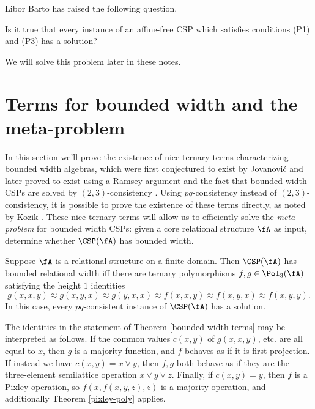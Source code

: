 Libor Barto has raised the following question.

\begin{prob}\label{prob-p1-p3} Is it true that every instance of an affine-free CSP which satisfies conditions (P1) and (P3) has a solution?
\end{prob}

We will solve this problem later in these notes.


\section{Terms for bounded width and the meta-problem}

In this section we'll prove the existence of nice ternary terms characterizing bounded width algebras, which were first conjectured to exist by Jovanovi\'c \cite{jovanovic-terms} and later proved to exist using a Ramsey argument and the fact that bounded width CSPs are solved by $(2,3)$-consistency \cite{optimal-maltsev}. Using $pq$-consistency instead of $(2,3)$-consistency, it is possible to prove the existence of these terms directly, as noted by Kozik \cite{pq-consistency}. These nice ternary terms will allow us to efficiently solve the \emph{meta-problem} for bounded width CSPs: given a core relational structure $\fA$ as input, determine whether $\CSP(\fA)$ has bounded width.

\begin{thm}\label{bounded-width-terms} Suppose $\fA$ is a relational structure on a finite domain. Then $\CSP(\fA)$ has bounded relational width iff there are ternary polymorphisms $f,g \in \Pol_3(\fA)$ satisfying the height $1$ identities
\[
g(x,x,y) \approx g(x,y,x) \approx g(y,x,x) \approx f(x,x,y) \approx f(x,y,x) \approx f(x,y,y).
\]
In this case, every $pq$-consistent instance of $\CSP(\fA)$ has a solution.
\end{thm}

The identities in the statement of Theorem \ref{bounded-width-terms} may be interpreted as follows. If the common values $c(x,y)$ of $g(x,x,y)$, etc. are all equal to $x$, then $g$ is a majority function, and $f$ behaves as if it is first projection. If instead we have $c(x,y) = x \vee y$, then $f,g$ both behave as if they are the three-element semilattice operation $x \vee y \vee z$. Finally, if $c(x,y) = y$, then $f$ is a Pixley operation, so $f(x,f(x,y,z),z)$ is a majority operation, and additionally Theorem \ref{pixley-poly} applies.

